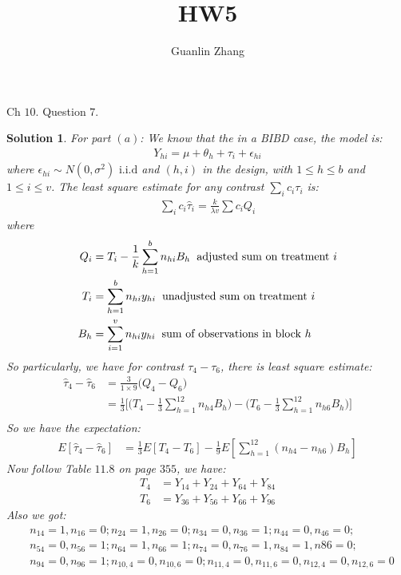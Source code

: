 \documentclass[11pt]{article}
\title{HW5}
\author{Guanlin Zhang}
\newtheorem{sol}{Solution}
\begin{document}
Ch $10.$ Question $7$.
\begin{sol}
For part $(a)$:\vskip 2mm
We know that the in a BIBD case, the model is:
\begin{align*}
	Y_{hi} = \mu + \theta_h + \tau_i + \epsilon_{hi}
\end{align*}
where $\epsilon_{hi} \sim N(0, \sigma^2) \text{ i.i.d}$ and $(h, i)$ in the design, with $1 \leq h \leq b$ and $1 \leq i \leq v$.\vskip 2mm
 The least square estimate for any contrast $\sum_i c_i\tau_i$ is:
\begin{align*}
	\sum_i c_i\hat{\tau}_i = \frac{k}{\lambda v}\sum c_i Q_i 
\end{align*}
where
\begin{align*}
	Q_i &= T_i - \frac{1}{k}\sum_{h = 1}^bn_{hi}B_h\hskip 2mm \text{adjusted sum on treatment }i\\
	T_i &= \sum_{h = 1}^b n_{hi}y_{hi}\hskip 2mm \text{unadjusted sum on treatment }i\\
	B_h &= \sum_{i = 1}^v n_{hi}y_{hi} \hskip 2mm \text{sum of observations in block }h
\end{align*}
So particularly, we have for contrast $\tau_4 - \tau_6$, there is least square estimate:
\begin{align*}
	\hat{\tau}_4 - \hat{\tau}_6 &= \frac{3}{1 \times 9}\Big(Q_4 - Q_6\Big)\\
	&= \frac{1}{3}\Big[\Big(T_4 - \frac{1}{3}\sum_{h = 1}^{12}n_{h4}B_h\Big) - \Big(T_6 - \frac{1}{3}\sum_{h  = 1}^{12}n_{h6}B_h\Big)\Big]\\
\end{align*}
So we have the expectation:
\begin{align*}
	E[\hat{\tau}_4 - \hat{\tau}_6] &= \frac{1}{3}E[T_4 - T_6] - \frac{1}{9}E[\sum_{h = 1}^{12}(n_{h4} - n_{h6})B_h]
\end{align*}
Now follow Table $11.8$ on page $355$, we have:
\begin{align*}
	T_4 &= Y_{14} + Y_{24} + Y_{64} + Y_{84}\\
	T_6 &= Y_{36} + Y_{56} + Y_{66} + Y_{96}
\end{align*}
Also we got:
\begin{align*}
	& n_{14} = 1, n_{16} = 0; n_{24} = 1, n_{26} = 0; n_{34} = 0, n_{36} = 1; n_{44} = 0, n_{46} = 0; \\
	& n_{54} = 0, n_{56} = 1; n_{64} = 1, n_{66} = 1; n_{74} = 0, n_{76} = 1, n_{84} = 1, n{86} = 0;\\
	& n_{94} = 0, n_{96} = 1; n_{10, 4} = 0, n_{10, 6} = 0; n_{11, 4} = 0, n_{11, 6} = 0, n_{12, 4} = 0, n_{12, 6} = 0

\end{align*}
\end{sol}
\end{document}
